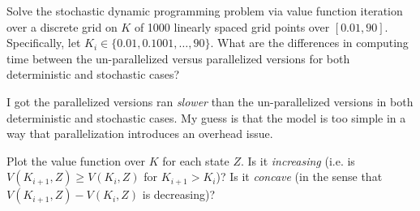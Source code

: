 

\par {}

\begin{framedexercise}[VFI] Solve the stochastic dynamic programming problem via value function
    iteration over a discrete grid on $K$ of 1000 linearly spaced grid points
    over $[0.01, 90]$. Specifically, let $K_i \in \{0.01, 0.1001, \ldots, 90\}$.
    What are the differences in computing time between the un-parallelized versus
    parallelized versions for both deterministic and stochastic cases?
\end{framedexercise}

\begin{solution}
    I got the parallelized versions ran \textit{slower} than the un-parallelized versions
    in both deterministic and stochastic cases.
    My guess is that the model is too simple in a way that parallelization
    introduces an overhead issue.
\end{solution}

\begin{framedexercise}Plot the value function over $K$ for each state $Z$.
    Is it \textit{increasing} (i.e. is $V(K_{i+1},Z) \geq V(K_i,Z)$ for $K_{i+1} > K_i$)?
    Is it \textit{concave} (in the sense that $V(K_{i+1},Z) - V(K_i,Z)$ is decreasing)?
\end{framedexercise}


